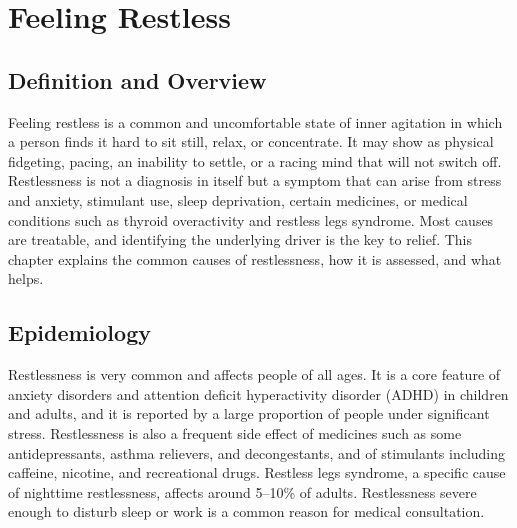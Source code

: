 \chapter{Feeling Restless}

\section*{Definition and Overview}
Feeling restless is a common and uncomfortable state of inner agitation in which a person finds it hard to sit still, relax, or concentrate. It may show as physical fidgeting, pacing, an inability to settle, or a racing mind that will not switch off. Restlessness is not a diagnosis in itself but a symptom that can arise from stress and anxiety, stimulant use, sleep deprivation, certain medicines, or medical conditions such as thyroid overactivity and restless legs syndrome. Most causes are treatable, and identifying the underlying driver is the key to relief. This chapter explains the common causes of restlessness, how it is assessed, and what helps.

\section*{Epidemiology}
Restlessness is very common and affects people of all ages. It is a core feature of anxiety disorders and attention deficit hyperactivity disorder (ADHD) in children and adults, and it is reported by a large proportion of people under significant stress. Restlessness is also a frequent side effect of medicines such as some antidepressants, asthma relievers, and decongestants, and of stimulants including caffeine, nicotine, and recreational drugs. Restless legs syndrome, a specific cause of nighttime restlessness, affects around 5--10\% of adults. Restlessness severe enough to disturb sleep or work is a common reason for medical consultation.

